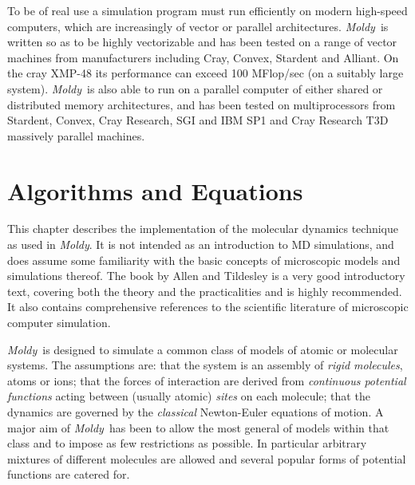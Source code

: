 \documentclass[twoside]{report}
\newcommand{\moldy}{{\em Moldy}}
\begin{document}
To be of real use a simulation  program must run efficiently on modern
high-speed computers, which  are  increasingly of vector   or parallel
architectures.  \moldy\  is written so  as to be highly vectorizable and
has been  tested on a   range of  vector machines  from  manufacturers
including Cray, Convex, Stardent and  Alliant.  On the cray XMP-48 its
performance can exceed 100 MFlop/sec (on a suitably large  system).
\moldy\ is also able to run on a parallel computer of either shared or
distributed memory architectures, and has been tested on
multiprocessors from Stardent, Convex, Cray Research, SGI and IBM SP1
and Cray Research T3D massively parallel machines.

\chapter{Algorithms and Equations}  %


This chapter  describes the implementation  of the  molecular dynamics
technique as used in \moldy.  It is not intended as an introduction to
MD  simulations, and  does assume some    familiarity  with the  basic
concepts of microscopic models  and simulations thereof.  The book  by
Allen and Tildesley\cite{allen:87}  is a  very good    introductory text,
covering   both the  theory  and  the  practicalities and  is   highly
recommended.  It   also  contains   comprehensive  references  to  the
scientific literature of microscopic computer simulation.

\moldy\  is designed to simulate a common class of models of atomic or
molecular systems. The assumptions are: that the system is an assembly
of  {\em rigid   molecules},  atoms   or  ions;  that  the  forces  of
interaction are derived   from {\em  continuous  potential  functions\/}
acting between (usually atomic) {\em sites\/} on each molecule; that the
dynamics are governed by the {\em classical\/} Newton-Euler equations of
motion.  A major aim of \moldy\ has been to allow the most  general of
models within that class and to impose as few restrictions as possible.
In particular arbitrary mixtures of different molecules are allowed
and several popular forms of potential functions are catered for.
\end{document}
